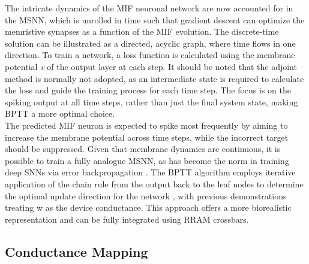\noindent The intricate dynamics of the MIF neuronal network are now accounted for in the MSNN, which is unrolled in time such that gradient descent can optimize the memristive synapses as a function of the MIF evolution. The discrete-time solution can be illustrated as a directed, acyclic graph, where time flows in one direction. To train a network, a loss function is calculated using the membrane potential \textit{v} of the output layer at each step. It should be noted that the adjoint method \cite{chen2018neural} is normally not adopted, as an intermediate state is required to calculate the loss and guide the training process for each time step. The focus is on the spiking output at all time steps, rather than just the final system state, making BPTT a more optimal choice.\\



\noindent The predicted MIF neuron is expected to spike most frequently by aiming to increase the membrane potential across time steps, while the incorrect target should be suppressed. Given that membrane dynamics are continuous, it is possible to train a fully analogue MSNN, as has become the norm in training deep SNNs via error backpropagation \cite{neftci2019surrogate}. The BPTT algorithm employs iterative application of the chain rule from the output back to the leaf nodes to determine the optimal update direction for the network \cite{eshraghian2023training}, with previous demonstrations treating w as the device conductance. This approach offers a more biorealistic representation and can be fully integrated using RRAM crossbars.

\subsection[Conductance Mapping]{Conductance Mapping}


